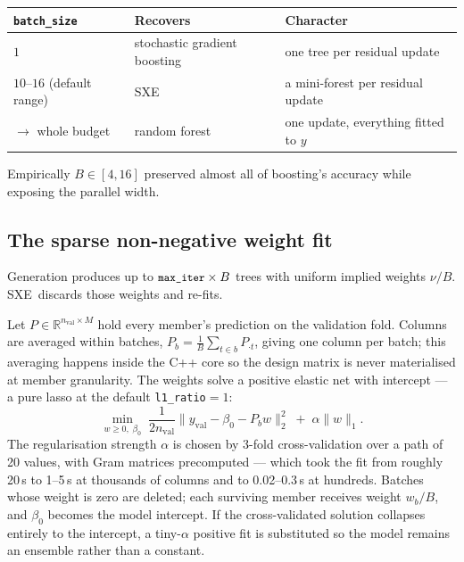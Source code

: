 \documentclass[11pt,a4paper]{article}
\newcommand{\code}[1]{\texttt{\small #1}}
\newcommand{\SXE}{\textsc{SXE}}
\theoremstyle{definition}
\begin{document}
\begin{center}
\begin{tabular}{lll}
\toprule
\code{batch\_size} & Recovers & Character \\
\midrule
$1$ & stochastic gradient boosting & one tree per residual update \\
$10$--$16$ (default range) & \SXE & a mini-forest per residual update \\
$\to$ whole budget & random forest & one update, everything fitted to $y$ \\
\bottomrule
\end{tabular}
\end{center}

Empirically $B \in [4,16]$ preserved almost all of boosting's accuracy while
exposing the parallel width.

\subsection{The sparse non-negative weight fit}\label{sec:weights}

Generation produces up to $\code{max\_iter} \times B$ trees with uniform
implied weights $\nu/B$. \SXE\ discards those weights and re-fits.

Let $P \in \mathbb{R}^{n_{\text{val}} \times M}$ hold every member's prediction
on the validation fold. Columns are averaged within batches,
$P_b = \frac{1}{B}\sum_{t \in b} P_{\cdot t}$, giving one column per batch;
this averaging happens inside the C++ core so the design matrix is never
materialised at member granularity. The weights solve a positive elastic net
with intercept --- a pure lasso at the default \code{l1\_ratio}$=1$:
\begin{equation}\label{eq:lasso}
\min_{w \ge 0,\; \beta_0} \;
\frac{1}{2 n_{\text{val}}} \big\| y_{\text{val}} - \beta_0 - P_b w \big\|_2^2
\;+\; \alpha \|w\|_1 .
\end{equation}
The regularisation strength $\alpha$ is chosen by 3-fold cross-validation over
a path of 20 values, with Gram matrices precomputed --- which took the fit from
roughly 20\,s to 1--5\,s at thousands of columns and to 0.02--0.3\,s at
hundreds. Batches whose weight is zero are deleted; each surviving member
receives weight $w_b / B$, and $\beta_0$ becomes the model intercept. If the
cross-validated solution collapses entirely to the intercept, a tiny-$\alpha$
positive fit is substituted so the model remains an ensemble rather than a
constant.
\end{document}

